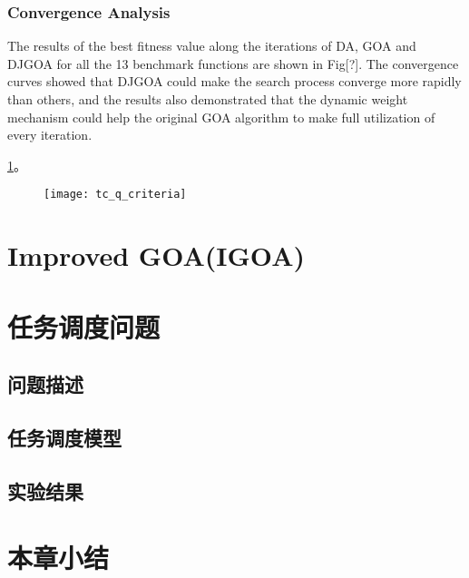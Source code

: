 \subsubsection{Convergence Analysis}
The results of the best fitness value along the iterations of DA, GOA and DJGOA for all the 13 benchmark functions are shown in Fig[?]. The convergence curves showed that DJGOA could make the search process converge more rapidly than others, and the results also demonstrated that the dynamic weight mechanism could help the original GOA algorithm to make full utilization of every iteration.


\ref{fig:tc_q_criteria}。
\begin{figure}[!htbp]
    \centering
    \texttt{[image: tc\_q\_criteria]}
    \label{fig:tc_q_criteria}
\end{figure}
\section{Improved GOA(IGOA)}

\section{任务调度问题}
\subsection{问题描述}
\subsection{任务调度模型}
\subsection{实验结果}


\section{本章小结}